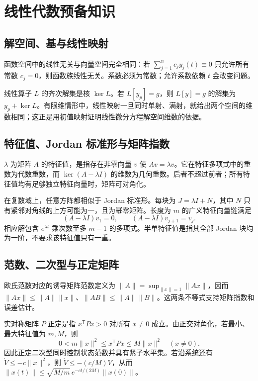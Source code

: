 \setcounter{chapter}{1} %
\chapter{线性代数预备知识}
\label{app:ode-algebra}

\section{解空间、基与线性映射}
函数空间中的线性无关与向量空间完全相同：若 $\sum_{j=1}^n c_jy_j(t)\equiv0$ 只允许所有常数 $c_j=0$，则函数族线性无关。系数必须为常数；允许系数依赖 $t$ 会改变问题。

线性算子 $L$ 的齐次解集是核 $\ker L$。若 $L[y_p]=g$，则 $L[y]=g$ 的解集为 $y_p+\ker L$。有限维情形中，线性映射一旦同时单射、满射，就给出两个空间的维数相同；这正是用初值映射证明线性微分方程解空间维数的依据。

\section{特征值、Jordan 标准形与矩阵指数}
$\lambda$ 为矩阵 $A$ 的特征值，是指存在非零向量 $v$ 使 $Av=\lambda v$。它在特征多项式中的重数为代数重数，而 $\ker(A-\lambda I)$ 的维数为几何重数。后者不超过前者；所有特征值均有足够独立特征向量时，矩阵可对角化。

在复数域上，任意方阵都相似于 Jordan 标准形。每块为 $J=\lambda I+N$，其中 $N$ 只有紧邻对角线的上方可能为一，且为幂零矩阵。长度为 $m$ 的广义特征向量链满足
\[
 (A-\lambda I)v_1=0,\qquad (A-\lambda I)v_{j+1}=v_j.
\]
相应解包含 $e^{\lambda t}$ 乘次数至多 $m-1$ 的多项式。半单特征值是指其全部 Jordan 块均为一阶，不要求该特征值只有一重。

\section{范数、二次型与正定矩阵}
欧氏范数对应的诱导矩阵范数定义为 $\|A\|=\sup_{\|x\|=1}\|Ax\|$，因而 $\|Ax\|\leq\|A\|\|x\|$、$\|AB\|\leq\|A\|\|B\|$。这两条不等式支持矩阵指数和误差估计。

实对称矩阵 $P$ 正定是指 $x^{\mathsf T}Px>0$ 对所有 $x\ne0$ 成立。由正交对角化，若最小、最大特征值为 $m,M$，则
\[
 0<m\|x\|^2\leq x^{\mathsf T}Px\leq M\|x\|^2\quad(x\ne0).
\]
因此正定二次型同时控制状态范数并具有紧子水平集。若沿系统还有 $\dot V\leq-c\|x\|^2$，则 $\dot V\leq-(c/M)V$，从而 $\|x(t)\|\leq\sqrt{M/m}\,e^{-ct/(2M)}\|x(0)\|$。

